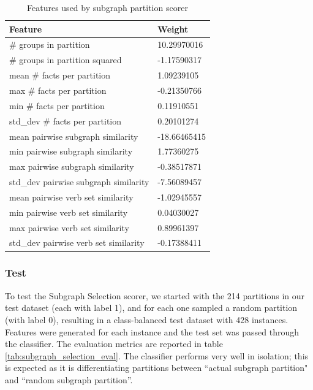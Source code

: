 \documentclass[12pt]{article}
\begin{document}
\begin{table}[H]
\centering
\caption{Features used by subgraph partition scorer}
\label{tab:subgraph_selection_features}
\begin{tabular}{@{}ll@{}}
\toprule
\textbf{Feature}                      & \textbf{Weight} \\ \midrule
\# groups in partition                & 10.29970016     \\
\# groups in partition squared        & -1.17590317     \\
mean \# facts per partition           & 1.09239105      \\
max \# facts per partition            & -0.21350766     \\
min \# facts per partition            & 0.11910551      \\
std\_dev \# facts per partition       & 0.20101274      \\
mean pairwise subgraph similarity     & -18.66465415    \\
min pairwise subgraph similarity      & 1.77360275      \\
max pairwise subgraph similarity      & -0.38517871     \\
std\_dev pairwise subgraph similarity & -7.56089457     \\
mean pairwise verb set similarity     & -1.02945557     \\
min pairwise verb set similarity      & 0.04030027      \\
max pairwise verb set similarity      & 0.89961397      \\
std\_dev pairwise verb set similarity & -0.17388411     \\ \bottomrule
\end{tabular}
\end{table}

\subsubsection{Test}

To test the Subgraph Selection scorer, we started with the 214 partitions in our test dataset (each with label 1), and for each one sampled a random partition (with label 0), resulting in a class-balanced test dataset with 428 instances. Features were generated for each instance and the test set was passed through the classifier. The evaluation metrics are reported in table \ref{tab:subgraph_selection_eval}. The classifier performs very well in isolation; this is expected as it is differentiating partitions between ``actual subgraph partition" and ``random subgraph partition''.
\end{document}
